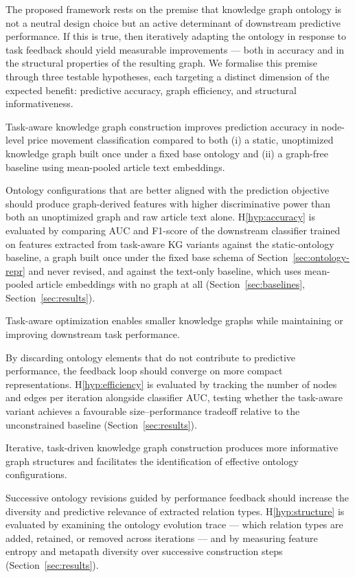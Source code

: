 The proposed framework rests on the premise that knowledge graph ontology is not a
neutral design choice but an active determinant of downstream predictive performance.
If this is true, then iteratively adapting the ontology in response to task feedback
should yield measurable improvements --- both in accuracy and in the structural
properties of the resulting graph. We formalise this premise through three testable
hypotheses, each targeting a distinct dimension of the expected benefit: predictive
accuracy, graph efficiency, and structural informativeness.

\begin{hypothesis}\label{hyp:accuracy}
Task-aware knowledge graph construction improves prediction accuracy in node-level
price movement classification compared to both (i) a static, unoptimized knowledge
graph built once under a fixed base ontology and (ii) a graph-free baseline using
mean-pooled article text embeddings.
\end{hypothesis}

Ontology configurations that are better aligned with the prediction objective should
produce graph-derived features with higher discriminative power than both an
unoptimized graph and raw article text alone. H\ref{hyp:accuracy} is evaluated by
comparing AUC and F1-score of the downstream classifier trained on features extracted
from task-aware KG variants against the static-ontology baseline, a graph built once
under the fixed base schema of Section~\ref{sec:ontology-repr} and never revised, and
against the text-only baseline, which uses mean-pooled article embeddings with no
graph at all (Section~\ref{sec:baselines}, Section~\ref{sec:results}).

\begin{hypothesis}\label{hyp:efficiency}
Task-aware optimization enables smaller knowledge graphs while maintaining or
improving downstream task performance.
\end{hypothesis}

By discarding ontology elements that do not contribute to predictive performance, the
feedback loop should converge on more compact representations. H\ref{hyp:efficiency}
is evaluated by tracking the number of nodes and edges per iteration alongside
classifier AUC, testing whether the task-aware variant achieves a favourable
size--performance tradeoff relative to the unconstrained baseline
(Section~\ref{sec:results}).

\begin{hypothesis}\label{hyp:structure}
Iterative, task-driven knowledge graph construction produces more informative graph
structures and facilitates the identification of effective ontology configurations.
\end{hypothesis}

Successive ontology revisions guided by performance feedback should increase the
diversity and predictive relevance of extracted relation types. H\ref{hyp:structure}
is evaluated by examining the ontology evolution trace --- which relation types are
added, retained, or removed across iterations --- and by measuring feature entropy
and metapath diversity over successive construction steps
(Section~\ref{sec:results}).
